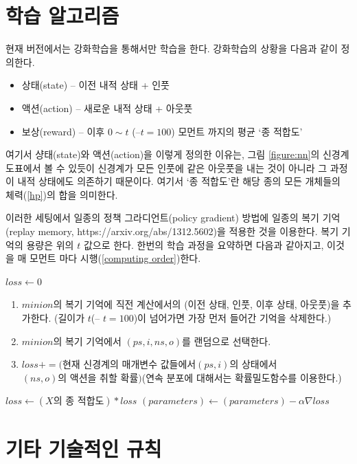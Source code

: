 \documentclass[a4paper,12pt]{article}
\begin{document}
\section{학습 알고리즘}\label{learning algorithm}

현재 버전에서는 강화학습을 통해서만 학습을 한다. 
강화학습의 상황을 다음과 같이 정의한다.
\begin{itemize}
	\item 상태(state) – 이전 내적 상태 + 인풋 
	\item 액션(action) – 새로운 내적 상태 + 아웃풋
	\item 보상(reward) – 이후 $0\sim t$ (--$t=100$) 모먼트 까지의 평균 ‘종 적합도’ 
\end{itemize}
여기서 샹태(state)와 액션(action)을 이렇게 정의한 이유는,
그림 \ref{figure:nn}의 신경계 도표에서 볼 수 있듯이 신경계가 모든 인풋에 같은 아웃풋을 내는 것이 아니라 그 과정이 내적 상태에도 의존하기 때문이다. 
여기서 ‘종 적합도’란 해당 종의 모든 개체들의 체력(\ref{hp})의 합을 의미한다. 
\par 
이러한 세팅에서 일종의 정책 그라디언트(policy gradient) 방법에 일종의 복기 기억 (replay memory, https://arxiv.org/abs/1312.5602)을 적용한 것을 이용한다. 복기 기억의 용량은 위의 $t$ 값으로 한다. 한번의 학습 과정을 요약하면 다음과 같아지고, 이것을 매 모먼트 마다 시행(\ref{computing order})한다. 


\begin{algorithmic}
\State $loss\gets 0$
	\State 
	\begin{enumerate}
	\item$minion$의 복기 기억에 직전 계산에서의 (이전 상태, 인풋, 이후 상태, 아웃풋)을 추가한다. 
	(길이가 $t$(-- $t=100$)이 넘어가면 가장 먼저 들어간 기억을 삭제한다.)
	\item $minion$의 복기 기억에서 $(ps,i,ns,o)$를 랜덤으로 선택한다.
	\item $loss+=(\text{현재 신경계의 매개변수 값들에서} (ps,i)\text{의 상태에서}$\newline $(ns,o)\text{의 액션을 취할 확률})$(연속 분포에 대해서는 확률밀도함수를 이용한다.)
	\end{enumerate}
\EndFor 
\State $loss\gets(X\text{의 종 적합도})*loss$ 
\State $(parameters)\gets(parameters)-\alpha\nabla loss$
\end{algorithmic}


\section{기타 기술적인 규칙}
\end{document}
